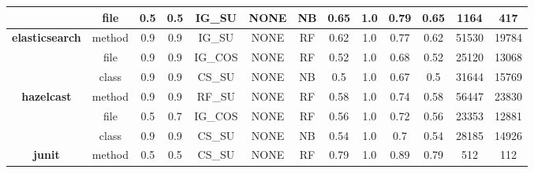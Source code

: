 \begin{table}[H]
{\begin{tabular}{@{}ccccccccccccc@{}}
                                                         & file                   & 0.5        & 0.5           & IG\_SU                   & NONE                       & NB             & 0.65               & 1.0             & 0.79       & 0.65              & 1164               & 417           \\
                                                         \hline
\multirow{3}{*}{\textbf{elasticsearch}}                  & method                 & 0.9        & 0.9           & IG\_SU                   & NONE                       & RF             & 0.62               & 1.0             & 0.77       & 0.62              & 51530              & 19784         \\
                                                         & file                   & 0.9        & 0.9           & IG\_COS                  & NONE                       & RF             & 0.52               & 1.0             & 0.68       & 0.52              & 25120              & 13068         \\
                                                         & class                  & 0.9        & 0.9           & CS\_SU                   & NONE                       & NB             & 0.5                & 1.0             & 0.67       & 0.5               & 31644              & 15769         \\
                                                         \hline
\multirow{3}{*}{\textbf{hazelcast}}                      & method                 & 0.9        & 0.9           & RF\_SU                   & NONE                       & RF             & 0.58               & 1.0             & 0.74       & 0.58              & 56447              & 23830         \\
                                                         & file                   & 0.5        & 0.7           & IG\_COS                  & NONE                       & RF             & 0.56               & 1.0             & 0.72       & 0.56              & 23353              & 12881         \\
                                                         & class                  & 0.9        & 0.9           & CS\_SU                   & NONE                       & NB             & 0.54               & 1.0             & 0.7        & 0.54              & 28185              & 14926         \\
                                                         \hline
\multirow{3}{*}{\textbf{junit}}                          & method                 & 0.5        & 0.5           & CS\_SU                   & NONE                       & RF             & 0.79               & 1.0             & 0.89       & 0.79              & 512                & 112           \\

\end{tabular}}
\end{table}
